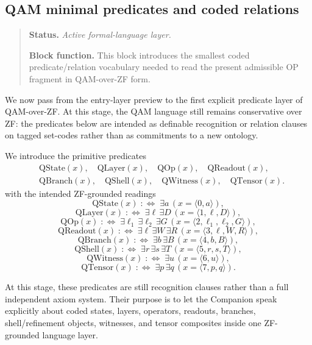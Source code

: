\subsection*{QAM minimal predicates and coded relations}
\begin{quote}\small
\noindent\textbf{Status.} \emph{Active formal-language layer.}\par
\noindent\textbf{Block function.} This block introduces the smallest coded predicate/relation vocabulary needed to read the present admissible OP fragment in QAM-over-ZF form.
\end{quote}

We now pass from the entry-layer preview to the first explicit predicate layer of QAM-over-ZF. At this stage, the QAM language still remains conservative over ZF: the predicates below are intended as definable recognition or relation clauses on tagged set-codes rather than as commitments to a new ontology.

\begin{definition}
We introduce the primitive predicates
\[
\begin{aligned}
&\mathrm{QState}(x),\quad \mathrm{QLayer}(x),\quad \mathrm{QOp}(x),\quad \mathrm{QReadout}(x),\\[0.15em]
&\mathrm{QBranch}(x),\quad \mathrm{QShell}(x),\quad \mathrm{QWitness}(x),\quad \mathrm{QTensor}(x).
\end{aligned}
\]
with the intended ZF-grounded readings
\[
\mathrm{QState}(x)\;:\Longleftrightarrow\;\exists a\,(x=\langle 0,a\rangle),
\]
\[
\mathrm{QLayer}(x)\;:\Longleftrightarrow\;\exists \ell\,\exists D\,(x=\langle 1,\ell,D\rangle),
\]
\[
\mathrm{QOp}(x)\;:\Longleftrightarrow\;\exists \ell_1\,\exists \ell_2\,\exists G\,(x=\langle 2,\ell_1,\ell_2,G\rangle),
\]
\[
\mathrm{QReadout}(x)\;:\Longleftrightarrow\;\exists \ell\,\exists W\,\exists R\,(x=\langle 3,\ell,W,R\rangle),
\]
\[
\mathrm{QBranch}(x)\;:\Longleftrightarrow\;\exists b\,\exists B\,(x=\langle 4,b,B\rangle),
\]
\[
\mathrm{QShell}(x)\;:\Longleftrightarrow\;\exists r\,\exists s\,\exists T\,(x=\langle 5,r,s,T\rangle),
\]
\[
\mathrm{QWitness}(x)\;:\Longleftrightarrow\;\exists u\,(x=\langle 6,u\rangle),
\]
\[
\mathrm{QTensor}(x)\;:\Longleftrightarrow\;\exists p\,\exists q\,(x=\langle 7,p,q\rangle).
\]
\end{definition}

\begin{remark}
At this stage, these predicates are still recognition clauses rather than a full independent axiom system. Their purpose is to let the Companion speak explicitly about coded states, layers, operators, readouts, branches, shell/refinement objects, witnesses, and tensor composites inside one ZF-grounded language layer.
\end{remark}


